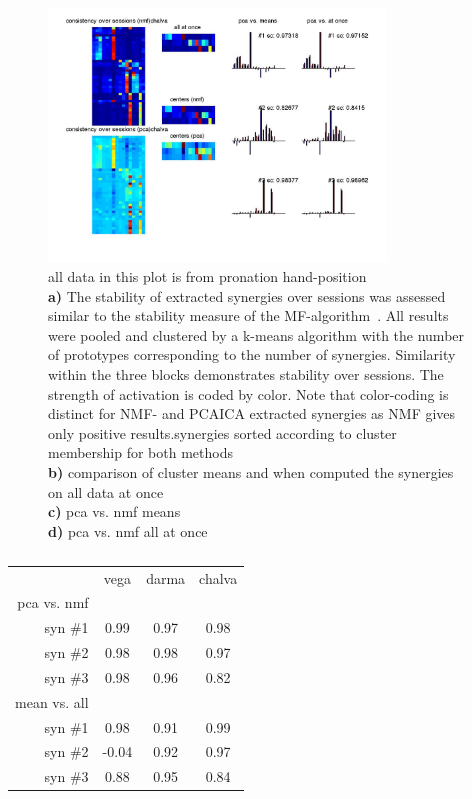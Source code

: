 \begin{figure}[ht]
    \centering
    \includegraphics[width=0.8\textwidth]{images/syn_consist_sessions_chalva.jpg}
    \caption{
    all data in this plot is from pronation hand-position\\
    \textbf{a)} The stability of extracted synergies over sessions was assessed similar to the stability measure of the MF-algorithm~. All results were pooled and clustered by a k-means algorithm with the number of prototypes corresponding to the number of synergies. Similarity within the three blocks demonstrates stability over sessions. The strength of activation is coded by color. Note that color-coding is distinct for NMF- and PCAICA extracted synergies as NMF gives only positive results.synergies sorted according to cluster membership for both methods\\
    \textbf{b)} comparison of cluster means and when computed the synergies on all data at once\\
    \textbf{c)} pca vs. nmf means\\
    \textbf{d)} pca vs. nmf all at once\\
    }
    \label{sg:fig:images_syn_consist_sessions_chalva}
\end{figure}

\begin{table}[ht]
	\centering
	\begin{tabular}{r|c|c|c}
		\toprule
		                    & vega  & darma & chalva \\
		pca vs. nmf         &       &       & \\
		syn \#1              & 0.99  & 0.97  & 0.98\\
		syn \#2              & 0.98  & 0.98  & 0.97\\
		syn \#3              & 0.98  & 0.96  & 0.82\\
		\midrule
		mean vs. all        &       &       & \\
		syn \#1              & 0.98  & 0.91  & 0.99\\
		syn \#2              & -0.04 & 0.92  & 0.97\\
		syn \#3              & 0.88  & 0.95  & 0.84\\
		\bottomrule
	\end{tabular}
	\caption{}
	\label{sg:tab:syn_consist}
\end{table}


